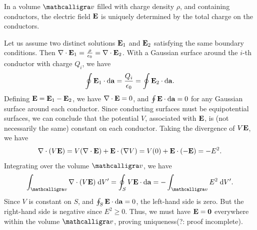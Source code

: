 \begin{theorem}
    In a volume $\curs{v}$ filled with charge density $\rho$, and containing conductors, the electric field $\mathbf{E}$ is uniquely determined by the total charge on the conductors.
\end{theorem}

Let us assume two distinct solutions $\mathbf{E}_{1}$ and $\mathbf{E}_{2}$ satisfying the same boundary conditions. Then $\nabla \cdot \mathbf{E}_{1} = \frac{\rho}{\epsilon_{0}} = \nabla \cdot \mathbf{E}_{2}$. With a Gaussian surface around the $i$-th conductor with charge $Q_{i}$, we have
\begin{align}
    \oint \mathbf{E}_{1} \cdot \mathrm{d}\mathbf{a} = \frac{Q_{i}}{\epsilon_{0}} = \oint \mathbf{E}_{2} \cdot \mathrm{d}\mathbf{a}.
\end{align}
Defining $\mathbf{E} = \mathbf{E}_{1} - \mathbf{E}_{2}$, we have $\nabla \cdot \mathbf{E} = 0$, and $\oint \mathbf{E} \cdot \mathrm{d}\mathbf{a} = 0$ for any Gaussian surface around each conductor. Since conducting surfaces must be equipotential surfaces, we can conclude that the potential $V$, associated with $\mathbf{E}$, is (not necessarily the same) constant on each conductor. Taking the divergence of $V \mathbf{E}$, we have
\begin{align}
    \nabla \cdot (V \mathbf{E}) = V (\nabla \cdot \mathbf{E}) + \mathbf{E} \cdot (\nabla V) = V (0) + \mathbf{E} \cdot (-\mathbf{E}) = - E^{2}.
\end{align}
Integrating over the volume $\curs{v}$, we have
\begin{align}
    \int_{\curs{v}} \nabla \cdot (V \bv{E}) \; \di{V'} = \oint_{S} V \bv{E} \cdot \di{\bv{a}} = - \int_{\curs{v}} E^{2} \; \di{V'}.
\end{align}
Since $V$ is constant on $S$, and $\oint_{S} \mathbf{E} \cdot \mathrm{d}\mathbf{a} = 0$, the left-hand side is zero. But the right-hand side is negative since $E^{2} \geq 0$. Thus, we must have $\mathbf{E} = \mathbf{0}$ everywhere within the volume $\curs{v}$, proving uniqueness(?: proof incomplete).

